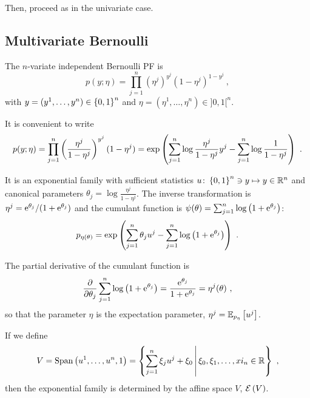 \documentclass[12pt,a4paper]{amsart}
\theoremstyle{remark}
\begin{document}
Then, proceed as in the univariate case.

\subsection{Multivariate Bernoulli}
\label{sec:mult-binom}

The $n$-variate independent Bernoulli PF is 
\begin{equation}
    p(y;\eta) = \prod_{j=1}^n (\eta^j)^{y^j}(1-\eta^j)^{1-y^j} \ , 
\end{equation}
with $y = (y^1,\dots,y^n) \in \left\{0,1\right\}^n$ and $\eta = (\eta^1,\dots,\eta^n) \in ]0,1[^n$.

It is convenient to write
\begin{equation}
  \label{eq:exponential-family}
    p(y;\eta) = \prod_{j=1}^n \left(\frac{\eta^j}{1-\eta^j}\right)^{y^j} (1 - \eta^j) = \exp\left(\sum_{j=1}^n \log \frac{\eta^j}{1-\eta^j} y^j - \sum_{j=1}^n \log \frac 1 {1 - \eta^j}\right) \ .
  \end{equation}

  It is an exponential family with sufficient statistics $u \colon \left\{0,1\right\}^n \ni y \mapsto y \in \mathbb{R}^n$ and canonical parameters $\theta_j = \log \frac{\eta^j}{1-\eta^j}$. The inverse transformation is $\eta^j = \mathrm{e}^{\theta_j}/(1+\mathrm{e}^{\theta_j})$ and the cumulant function is $\psi(\theta) = \sum_{j=1}^n \log \left(1 + \mathrm{e}^{\theta_j}\right)$:
      \begin{equation}
        \label{eq:21}
        p_{\eta(\theta)} = \exp\left(\sum_{j=1}^n \theta_j u^j - \sum_{j=1}^n \log \left(1 + \mathrm{e}^{\theta_j}\right)\right) \ .
      \end{equation}

 The partial derivative of the cumulant function is
      \begin{equation}
        \label{eq:26}
        \frac {\partial} {\partial \theta_j} \sum_{j=1}^n \log \left(1 + \mathrm{e}^{\theta_j}\right) = \frac{\mathrm{e}^{\theta_j}}{1 + \mathrm{e}^{\theta_j}} = \eta^j(\theta) \ , \end{equation}
      so that the parameter $\eta$ is the expectation parameter, $\eta^j = \operatorname{\mathbb E}_{p_\eta}\left[u^j\right]$.

If we define
\begin{equation}
  \label{eq:27}
  V = \operatorname{Span}\left(u^1,\dots,u^n,1\right) = \left\{\sum_{j=1}^n \xi_j u^j + \xi_0 \, \middle| \, \xi_0,\xi_1, \dots,xi_n \in \mathbb{R} \right\} \ ,
\end{equation}
then the exponential family is determined by the affine space $V$, $\operatorname{\mathcal E}\left(V\right)$.
\end{document}
